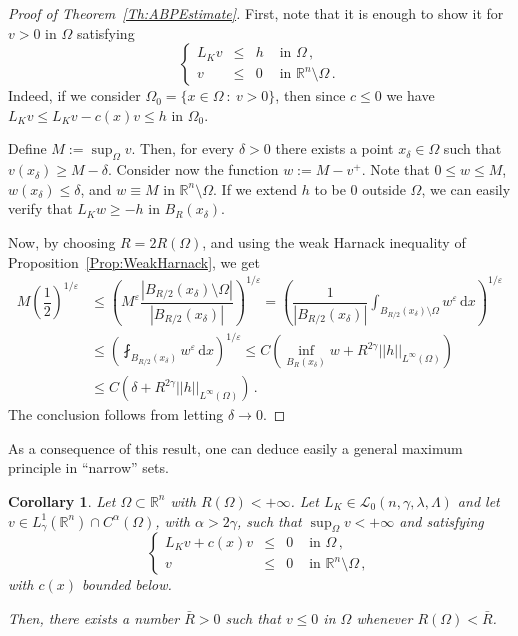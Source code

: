 \documentclass[12pt,reqno]{amsart}
\newtheorem{corollary}[theorem]{Corollary}
\theoremstyle{definition}
\theoremstyle{remark}
\newcommand{\con}[1]{\mathbb{#1}}
\newcommand{\R}{\con{R}} %
\newcommand{\lcal}{\mathcal{L}}
\newcommand{\norm}[1]{\left | \left |{#1} \right | \right |}
\newcommand{\s}{\gamma}
\renewcommand{\d}{\,\mathrm{d}} %
\newcommand{\bpar}[1]{\left ( {#1}\right )}
\newcommand\beqc[1]{\left\{\begin{array}{#1}}
\newcommand\eeqc{\end{array} \right.}
\def\PDEsystem{rcll}
\numberwithin{equation}{section}
\begin{document}
\begin{proof}[Proof of Theorem~\ref{Th:ABPEstimate}]
	First, note that it is enough to show it for $v > 0$ in $\Omega$ satisfying
	$$
	\beqc{\PDEsystem}
	L_K v &\leq & h & \text{ in } \Omega\,, \\
	v & \leq & 0 & \text{ in } \R^n\setminus \Omega\,.
	\eeqc
	$$
	Indeed, if we consider $\Omega_0 = \{x \in \Omega \ : \ v > 0\}$, then since $c \leq 0$ we have $L_K v \leq L_K v - c(x)v \leq h$ in $\Omega_0$.
	
	
	Define	$M:= \sup_\Omega v$. Then, for every $\delta >0$ there exists a point $x_\delta \in \Omega$ such that $v(x_\delta) \geq M - \delta$. Consider now the function $w := M - v^+$. Note that $0 \leq w \leq M$, $w(x_\delta) \leq \delta$, and $w \equiv M$ in $\R^n \setminus \Omega$. If we extend $h$ to be $0$ outside $\Omega$, we can easily verify that $L_K w \geq -h$ in $B_R(x_\delta)$.
	
	Now, by choosing $R= 2R(\Omega)$, and using the weak Harnack inequality of Proposition~\ref{Prop:WeakHarnack}, we get
	\begin{align*}
	M \left (\dfrac{1}{2}\right)^{1/\varepsilon} & \leq \bpar{M^{\varepsilon}\dfrac{|B_{R/2}(x_\delta)\setminus \Omega|}{|B_{R/2}(x_\delta)|}}^{1/\varepsilon}= \bpar{\dfrac{1}{|B_{R/2}(x_\delta)|} \int_{B_{R/2}(x_\delta)\setminus \Omega} w^\varepsilon \d x}^{1/\varepsilon} \\
	& \leq \bpar{ \fint_{B_{R/2}(x_\delta)} w^\varepsilon \d x}^{1/\varepsilon} \leq C \bpar{\inf_{B_{R}(x_\delta)} w + R^{2\s} \norm{h}_{L^{\infty}(\Omega)} } \\
	& \leq C \bpar{\delta + R^{2\s} \norm{h}_{L^{\infty}(\Omega)} }\,.
	\end{align*}
	The conclusion follows from letting $\delta \to 0$.
\end{proof}

As a consequence of this result, one can deduce easily a general maximum principle in ``narrow'' sets.

\begin{corollary}
	\label{Cor:MaxPpleNarrowDomains}
	Let $\Omega \subset \R^n$ with $R(\Omega) < +\infty$. Let $L_K \in \lcal_0(n,\s,\lambda, \Lambda)$ and let $v\in L^1_\s(\R^n)\cap C^{\alpha}(\Omega)$, with $\alpha > 2\s$, such that $\sup_{\Omega} v < +\infty$ and satisfying
	$$
	\beqc{\PDEsystem}
	L_K v + c(x)v &\leq & 0 & \text{ in } \Omega\,, \\
	v & \leq & 0 & \text{ in } \R^n\setminus \Omega\,,
	\eeqc
	$$
	with $c(x)$ bounded below.
	
	Then, there exists a number $\bar{R} > 0$ such that $v \leq 0$ in $\Omega$ whenever $R(\Omega)< \bar{R}$.	
\end{corollary}
\end{document}
